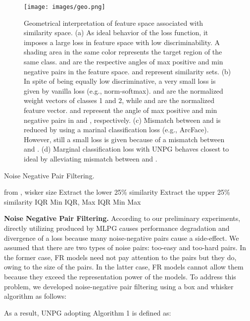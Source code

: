 \documentclass[10pt,twocolumn]{article}
\begin{document}
\begin{figure*}[t]
  \centering
  \texttt{[image: images/geo.png]}
  \caption{Geometrical interpretation of feature space associated with similarity space. (a) As ideal behavior of the loss function, it imposes a large loss in feature space with low discriminability. A shading area in the same color represents the target region of the same class.  and are the respective angles of max positive and min negative pairs in the feature space.  and  represent similarity sets. (b) In spite of being equally low discriminative, a very small loss is given by vanilla loss (e.g., norm-softmax).  and  are the normalized weight vectors of classes 1 and 2, while  and  are the normalized feature vector.  and  represent the angle of max positive and min negative pairs in  and , respectively. (c) Mismatch between  and  is reduced by using a marinal classification loss (e.g., ArcFace). However, still a small loss is given because of a mismatch between  and .  (d) Marginal classification loss with UNPG behaves closest to ideal by alleviating mismatch between  and .}
  \label{geo_inter}
\end{figure*}

\begin{algorithm}
\caption{Noise Negative Pair Filtering.}\label{alg:cap}
\begin{algorithmic}
\Require  from , wisker size 
\State Extract the lower 25\% similarity 
\State Extract the upper 25\% similarity 
\State IQR 
\State Min IQR, Max IQR
\State Min Max
\Ensure 
\end{algorithmic}
\end{algorithm}

\noindent\textbf{Noise Negative Pair Filtering.} According to our preliminary experiments, directly utilizing  produced by MLPG causes performance degradation and divergence of a loss because many noise-negative pairs cause a side-effect. We assumed that there are two types of noise pairs: too-easy and too-hard pairs. In the former case, FR models need not pay attention to the pairs but they do, owing to the size of the pairs. In the latter case, FR models cannot allow them because they exceed the representation power of the models. To address this problem, we developed noise-negative pair filtering using a box and whisker algorithm\cite{tukey1977exploratory} as follows:

As a result, UNPG adopting Algorithm 1 is defined as:
\end{document}
